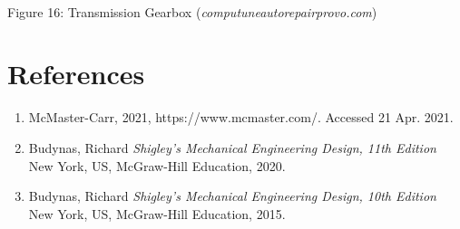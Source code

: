 \documentclass{article}
\begin{document}
\begin{center}
\\
\scriptsize{
Figure 16: Transmission Gearbox (\textit{computuneautorepairprovo.com})
}
\end{center}



\section{References}

\begin{enumerate}

\item McMaster-Carr, 2021, https://www.mcmaster.com/. Accessed 21 Apr. 2021.

\item Budynas, Richard \textit{Shigley's Mechanical Engineering Design, 11th Edition} New York, US, McGraw-Hill Education, 2020.

\item Budynas, Richard \textit{Shigley's Mechanical Engineering Design, 10th Edition} New York, US, McGraw-Hill Education, 2015.

\end{enumerate}
\end{document}
